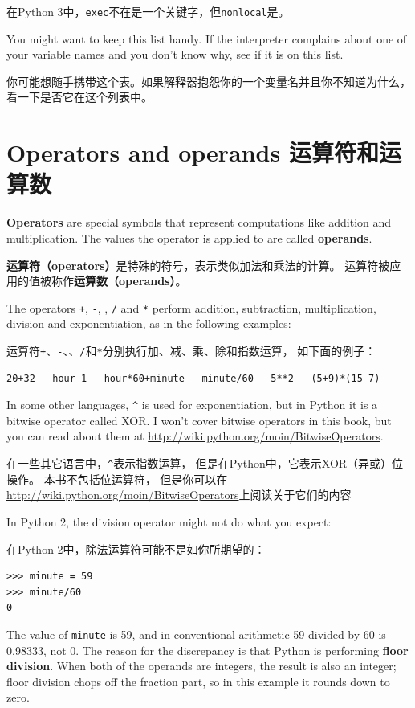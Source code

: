 \documentclass[10pt]{book}
\begin{document}
\begin{CJK}{UTF8}{gbsn}
在Python 3中，{\tt exec}不在是一个关键字，但{\tt nonlocal}是。

You might want to keep this list handy.  If the interpreter complains
about one of your variable names and you don't know why, see if it
is on this list.

你可能想随手携带这个表。如果解释器抱怨你的一个变量名并且你不知道为什么，
看一下是否它在这个列表中。

\section{Operators and operands 运算符和运算数}

{\bf Operators} are special symbols that represent computations like
addition and multiplication.  The values the operator is applied to
are called {\bf operands}.

{\bf 运算符（operators）}是特殊的符号，表示类似加法和乘法的计算。
运算符被应用的值被称作{\bf 运算数（operands）}。

The operators {\tt +}, {\tt -}, {\tt *}, {\tt /} and {\tt **}
perform addition, subtraction, multiplication, division and
exponentiation, as in the following examples:

运算符{\tt +}、{\tt -}、{\tt *}、{\tt /}和{\tt **}分别执行加、减、乘、除和指数运算，
如下面的例子：

\begin{verbatim}
20+32   hour-1   hour*60+minute   minute/60   5**2   (5+9)*(15-7)
\end{verbatim}
%
In some other languages, \verb"^" is used for exponentiation, but
in Python it is a bitwise operator called XOR.  I won't cover
bitwise operators in this book, but you can read about
them at \url{http://wiki.python.org/moin/BitwiseOperators}.

在一些其它语言中，\verb"^"表示指数运算，
但是在Python中，它表示XOR（异或）位操作。
本书不包括位运算符，
但是你可以在\url{http://wiki.python.org/moin/BitwiseOperators}上阅读关于它们的内容

In Python 2, the division operator might not do what you expect:

在Python 2中，除法运算符可能不是如你所期望的：

\begin{verbatim}
>>> minute = 59
>>> minute/60
0
\end{verbatim}
%
The value of {\tt minute} is 59, and in conventional arithmetic 59
divided by 60 is 0.98333, not 0.  The reason for the discrepancy is
that Python is performing {\bf floor division}.
When both of the operands are integers, the result is also an
integer; floor division chops off the fraction
part, so in this example it rounds down to zero.


\end{CJK}
\end{document}

